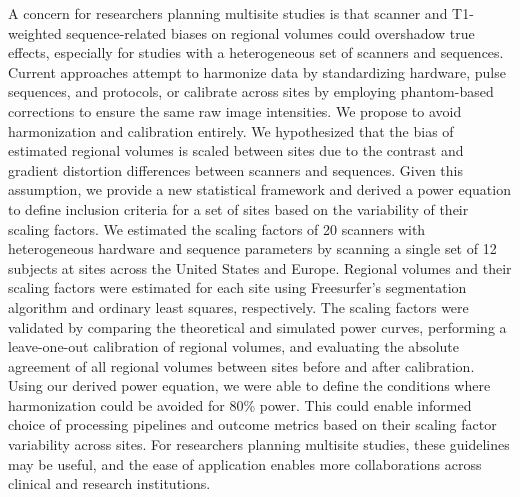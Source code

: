 
A concern for researchers planning multisite studies is that scanner and T1-weighted sequence-related biases on regional volumes could overshadow true effects, especially for studies with a heterogeneous set of scanners and sequences. Current approaches attempt to harmonize data by standardizing hardware, pulse sequences, and protocols, or calibrate across sites by employing phantom-based corrections to ensure the same raw image intensities. We propose to avoid harmonization and calibration entirely.  We hypothesized that the bias of estimated regional volumes is scaled between sites due to the contrast and gradient distortion differences between scanners and sequences. Given this assumption, we provide a new statistical framework and derived a power equation to define inclusion criteria for a set of sites based on the variability of their scaling factors. We estimated the scaling factors of 20 scanners with heterogeneous hardware and sequence parameters by scanning a single set of 12 subjects at sites across the United States and Europe. Regional volumes and their scaling factors were estimated for each site using Freesurfer's segmentation algorithm and ordinary least squares, respectively. The scaling factors were validated by comparing the theoretical and simulated power curves, performing a leave-one-out calibration of regional volumes, and evaluating the absolute agreement of all regional volumes between sites before and after calibration. Using our derived power equation, we were able to define the conditions where harmonization could be avoided for 80\% power. This could enable informed choice of processing pipelines and outcome metrics based on their scaling factor variability across sites. For researchers planning multisite studies, these guidelines may be useful, and the ease of application enables more collaborations across clinical and research institutions.